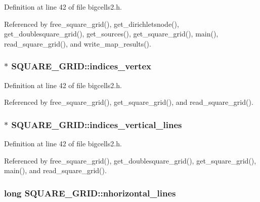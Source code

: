 Definition at line 42 of file bigcells2.\-h.



Referenced by free\-\_\-square\-\_\-grid(), get\-\_\-dirichletsnode(), get\-\_\-doublesquare\-\_\-grid(), get\-\_\-sources(), get\-\_\-square\-\_\-grid(), main(), read\-\_\-square\-\_\-grid(), and write\-\_\-map\-\_\-results().

\hypertarget{struct_s_q_u_a_r_e___g_r_i_d_a213bdd312eea160d5f0871f979e486b7}{
\subsubsection[{indices\-\_\-vertex}]{ $\ast$ S\-Q\-U\-A\-R\-E\-\_\-\-G\-R\-I\-D\-::indices\-\_\-vertex}}\label{struct_s_q_u_a_r_e___g_r_i_d_a213bdd312eea160d5f0871f979e486b7}


Definition at line 42 of file bigcells2.\-h.



Referenced by free\-\_\-square\-\_\-grid(), get\-\_\-square\-\_\-grid(), and read\-\_\-square\-\_\-grid().

\hypertarget{struct_s_q_u_a_r_e___g_r_i_d_a998e88cee9733cd52f311d413d25bb0c}{
\subsubsection[{indices\-\_\-vertical\-\_\-lines}]{ $\ast$ S\-Q\-U\-A\-R\-E\-\_\-\-G\-R\-I\-D\-::indices\-\_\-vertical\-\_\-lines}}\label{struct_s_q_u_a_r_e___g_r_i_d_a998e88cee9733cd52f311d413d25bb0c}


Definition at line 42 of file bigcells2.\-h.



Referenced by free\-\_\-square\-\_\-grid(), get\-\_\-doublesquare\-\_\-grid(), get\-\_\-square\-\_\-grid(), main(), and read\-\_\-square\-\_\-grid().

\hypertarget{struct_s_q_u_a_r_e___g_r_i_d_a0e71426cb4e6b8a3570d2a228314ffaa}{
\subsubsection[{nhorizontal\-\_\-lines}]{\setlength{\rightskip}{0pt plus 5cm}long S\-Q\-U\-A\-R\-E\-\_\-\-G\-R\-I\-D\-::nhorizontal\-\_\-lines}}\label{struct_s_q_u_a_r_e___g_r_i_d_a0e71426cb4e6b8a3570d2a228314ffaa}


